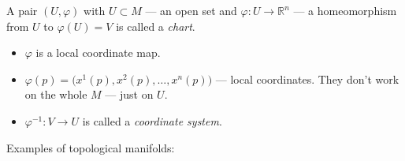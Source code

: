 \begin{samepage}
\begin{definition}
    A pair $(U, \varphi)$ with $U \subset M$ --- an open set and
    $\varphi: U \to \mathbb{R}^n$ --- a homeomorphism from
    $U$ to $\varphi(U) = V$ is called a \textit{chart}.
    \begin{itemize}
        \item {
            $\varphi$ is a local coordinate map.
        }
        \item {
            $\varphi(p) = \bigl(x^1(p), x^2(p), \dots, x^n(p)\bigr)$ --- local
            coordinates. They don't work on the whole $M$ --- just on $U$.
        }
        \item {
            $\varphi^{-1} : V \to U$ is called a \textit{coordinate system}.
        }
    \end{itemize}
\end{definition}
\end{samepage}
Examples of topological manifolds:
